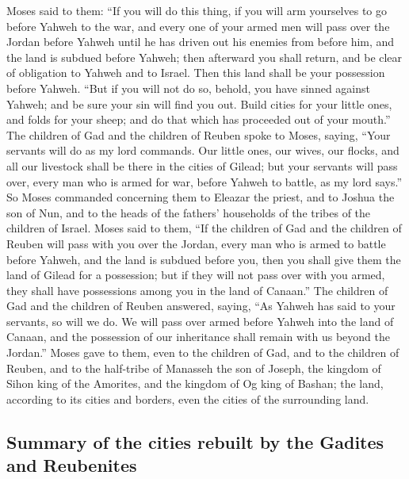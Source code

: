  Moses said to them: ``If you will do this thing, if you
will arm yourselves to go before Yahweh to the war,  and
every one of your armed men will pass over the Jordan before Yahweh
until he has driven out his enemies from before him,  and
the land is subdued before Yahweh; then afterward you shall return, and
be clear of obligation to Yahweh and to Israel. Then this land shall be
your possession before Yahweh.  ``But if you will not do
so, behold, you have sinned against Yahweh; and be sure your sin will
find you out.  Build cities for your little ones, and
folds for your sheep; and do that which has proceeded out of your
mouth.''  The children of Gad and the children of Reuben
spoke to Moses, saying, ``Your servants will do as my lord commands.
 Our little ones, our wives, our flocks, and all our
livestock shall be there in the cities of Gilead;  but
your servants will pass over, every man who is armed for war, before
Yahweh to battle, as my lord says.''  So Moses commanded
concerning them to Eleazar the priest, and to Joshua the son of Nun, and
to the heads of the fathers' households of the tribes of the children of
Israel.  Moses said to them, ``If the children of Gad and
the children of Reuben will pass with you over the Jordan, every man who
is armed to battle before Yahweh, and the land is subdued before you,
then you shall give them the land of Gilead for a possession;
 but if they will not pass over with you armed, they
shall have possessions among you in the land of Canaan.''
 The children of Gad and the children of Reuben answered,
saying, ``As Yahweh has said to your servants, so will we do.
 We will pass over armed before Yahweh into the land of
Canaan, and the possession of our inheritance shall remain with us
beyond the Jordan.''  Moses gave to them, even to the
children of Gad, and to the children of Reuben, and to the half-tribe of
Manasseh the son of Joseph, the kingdom of Sihon king of the Amorites,
and the kingdom of Og king of Bashan; the land, according to its cities
and borders, even the cities of the surrounding land.

\hypertarget{summary-of-the-cities-rebuilt-by-the-gadites-and-reubenites}{%
\subsection{Summary of the cities rebuilt by the Gadites and
Reubenites}\label{summary-of-the-cities-rebuilt-by-the-gadites-and-reubenites}}


